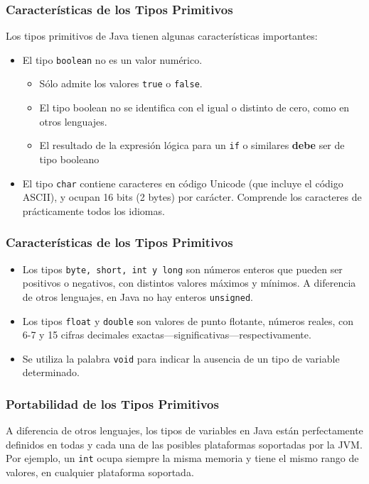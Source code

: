 \documentclass{beamer}
\begin{document}
\begin{frame}
  \frametitle{Características de los Tipos Primitivos}
  
  Los tipos primitivos de Java tienen algunas características importantes:

  \begin{itemize}
  \item El tipo \texttt{boolean} no es un valor numérico.

    \begin{itemize}
    \item Sólo admite los valores \texttt{true} o \texttt{false}. 
    \item El tipo boolean no se identifica con el igual o distinto de cero, como en otros lenguajes.
    \item El resultado de la expresión lógica para un \texttt{if} o
      similares \textbf{debe} ser de tipo booleano
    \end{itemize}
    
  \item El tipo \texttt{char} contiene caracteres en código Unicode
    (que incluye el código ASCII), y ocupan 16 bits (2 bytes) por
    carácter. Comprende los caracteres de prácticamente todos los
    idiomas.
  \end{itemize}
\end{frame}

\begin{frame}
  \frametitle{Características de los Tipos Primitivos}
  
  \begin{itemize}
  \item Los tipos \texttt{byte, short, int y long} son números enteros
    que pueden ser positivos o negativos, con distintos valores
    máximos y mínimos. A diferencia de otros lenguajes, en Java no hay
    enteros \texttt{unsigned}.
    
  \item Los tipos \texttt{float} y \texttt{double} son valores de
    punto flotante, números reales, con 6-7 y 15 cifras decimales
    exactas---significativas---respectivamente.
    
  \item Se utiliza la palabra \texttt{void} para indicar la ausencia
    de un tipo de variable determinado.
    
  \end{itemize}
\end{frame}

\begin{frame}
  \frametitle{Portabilidad de los Tipos Primitivos} 

  \begin{block}{}
    A diferencia de otros lenguajes, los tipos de variables en Java
    están perfectamente definidos en todas y cada una de las posibles
    plataformas soportadas por la JVM. Por ejemplo, un \texttt{int}
    ocupa siempre la misma memoria y tiene el mismo rango de valores,
    en cualquier plataforma soportada.
  \end{block}
\end{frame}
\end{document}
